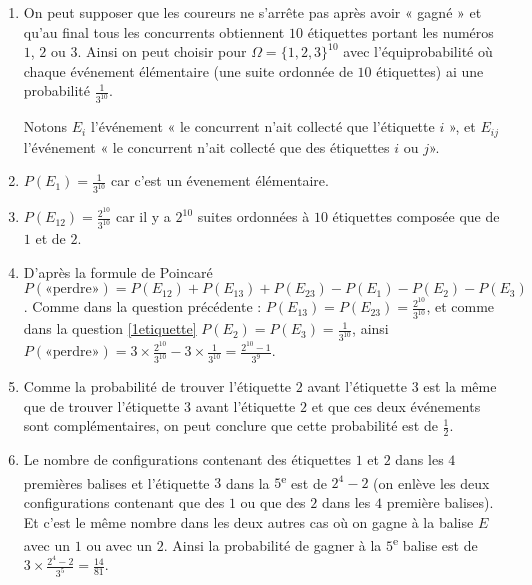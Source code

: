 \documentclass[a4paper,12pt,reqno]{amsart}
\begin{document}
\begin{solution}
  \begin{enumerate}
    \item On peut supposer que les coureurs ne s'arrête pas après avoir « gagné » et qu'au final tous les concurrents obtiennent $10$ étiquettes portant les numéros $1$, $2$ ou $3$. Ainsi on peut choisir pour $\Omega = \{1,2,3\}^{10}$ avec l'équiprobabilité où chaque événement élémentaire (une suite ordonnée de $10$ étiquettes) ai une probabilité $\frac{1}{3^{10}}$.

    Notons $E_{i}$ l'événement « le concurrent n'ait collecté que l'étiquette $i$ », et $E_{ij}$ l'événement « le concurrent n'ait collecté que des étiquettes $i$ ou $j$».

    \item\label{1etiquette} $P(E_{1}) = \frac{1}{3^{10}}$ car c'est un évenement élémentaire.
    \item $P(E_{12}) = \frac{2^{10}}{3^{10}}$ car il y a $2^{10}$ suites ordonnées à $10$ étiquettes composée que de $1$ et de $2$.
    \item\label{perdre} D'après la formule de Poincaré $P(\text{«perdre»}) = P(E_{12})+P(E_{13})+P(E_{23})-P(E_{1})-P(E_{2})-P(E_{3})$. Comme dans la question précédente : $P(E_{13}) = P(E_{23}) =\frac{2^{10}}{3^{10}}$, et comme dans la question \ref{1etiquette} $P(E_{2}) = P(E_{3}) = \frac{1}{3^{10}}$, ainsi $P(\text{«perdre»}) = 3 \times \frac{2^{10}}{3^{10}} - 3 \times \frac{1}{3^{10}}= \frac{2^{10}-1}{3^{9}}$.
    \item Comme la probabilité de trouver l'étiquette $2$ avant l'étiquette $3$ est la même que de trouver l'étiquette $3$ avant l'étiquette $2$ et que ces deux événements sont complémentaires, on peut conclure que cette probabilité est de $\frac{1}{2}$.
    \item Le nombre de configurations contenant des étiquettes $1$ et $2$ dans les $4$ premières balises et l'étiquette $3$ dans la $5$\textsuperscript{e} est de $2^{4}-2$ (on enlève les deux configurations contenant que des $1$ ou que des $2$ dans les $4$ première balises). Et c'est le même nombre dans les deux autres cas où on gagne à la balise $E$ avec un $1$ ou avec un $2$. Ainsi la probabilité de gagner à la $5$\textsuperscript{e} balise est de $3 \times \frac{2^{4}-2}{3^{5}} = \frac{14}{81}$.
  \end{enumerate}

\end{solution}
\end{document}
